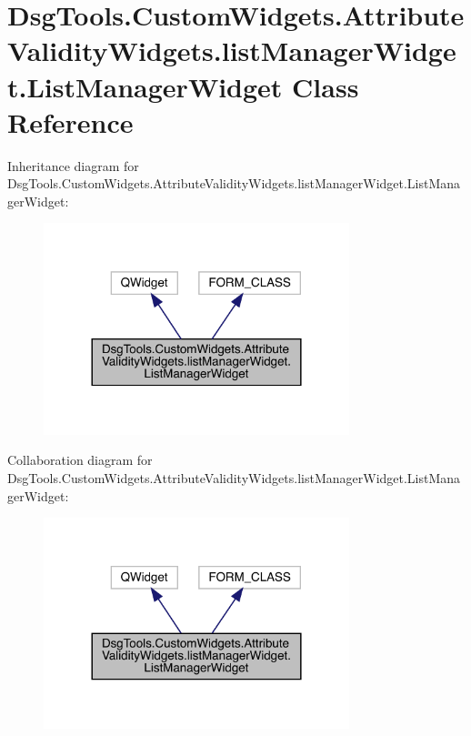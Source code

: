 \hypertarget{class_dsg_tools_1_1_custom_widgets_1_1_attribute_validity_widgets_1_1list_manager_widget_1_1_list_manager_widget}{}\section{Dsg\+Tools.\+Custom\+Widgets.\+Attribute\+Validity\+Widgets.\+list\+Manager\+Widget.\+List\+Manager\+Widget Class Reference}
\label{class_dsg_tools_1_1_custom_widgets_1_1_attribute_validity_widgets_1_1list_manager_widget_1_1_list_manager_widget}


Inheritance diagram for Dsg\+Tools.\+Custom\+Widgets.\+Attribute\+Validity\+Widgets.\+list\+Manager\+Widget.\+List\+Manager\+Widget\+:
\nopagebreak
\begin{figure}[H]
\begin{center}
\leavevmode
\includegraphics[width=252pt]{class_dsg_tools_1_1_custom_widgets_1_1_attribute_validity_widgets_1_1list_manager_widget_1_1_lisd2a3ed4e142313f0c54ef48d5ab3d9fa}
\end{center}
\end{figure}


Collaboration diagram for Dsg\+Tools.\+Custom\+Widgets.\+Attribute\+Validity\+Widgets.\+list\+Manager\+Widget.\+List\+Manager\+Widget\+:
\nopagebreak
\begin{figure}[H]
\begin{center}
\leavevmode
\includegraphics[width=252pt]{class_dsg_tools_1_1_custom_widgets_1_1_attribute_validity_widgets_1_1list_manager_widget_1_1_list_manager_widget__coll__graph}
\end{center}
\end{figure}
